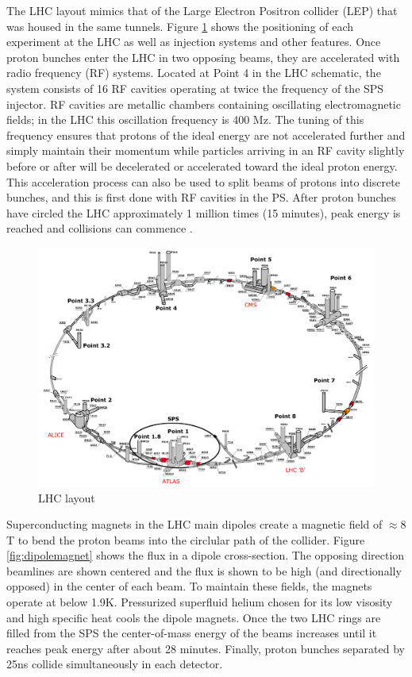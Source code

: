 The LHC layout mimics that of the Large Electron Positron collider (LEP) that was housed in the same tunnels. Figure \ref{fig:LHClayout} shows the positioning of each experiment at the LHC as well as injection systems and other features. Once proton bunches enter the LHC in two opposing beams, they are accelerated with radio frequency (RF) systems. Located at Point 4 in the LHC schematic, the system consists of 16 RF cavities operating at twice the frequency of the SPS injector. RF cavities are metallic chambers containing oscillating electromagnetic fields; in the LHC this oscillation frequency is 400 Mz. The tuning of this frequency ensures that protons of the ideal energy are not accelerated further and simply maintain their momentum while particles arriving in an RF cavity slightly before or after will be decelerated or accelerated toward the ideal proton energy. This acceleration process can also be used to split beams of protons into discrete bunches, and this is first done with RF cavities in the PS. After proton bunches have circled the LHC approximately 1 million times (15 minutes), peak energy is reached and collisions can commence \cite{radiofrequency}.

\begin{figure}[!h]
        \centering
    \includegraphics[width=.6\textwidth]{Pictures/LHClayout.PNG}
    \caption{LHC layout \cite{LHCref}}
    \label{fig:LHClayout}
\end{figure}

Superconducting magnets in the LHC main dipoles create a magnetic field of $\approx 8$ T to bend the proton beams into the circlular path of the collider. Figure \ref{fig:dipolemagnet} shows the flux in a dipole cross-section. The opposing direction beamlines are shown centered and the flux is shown to be high (and directionally opposed) in the center of each beam. To maintain these fields, the magnets operate at below 1.9K. Pressurized superfluid helium chosen for its low visosity and high specific heat cools the dipole magnets. Once the two LHC rings are filled from the SPS the center-of-mass energy of the beams increases until it reaches peak energy after about 28 minutes. Finally, proton bunches separated by 25ns collide simultaneously in each detector.  

